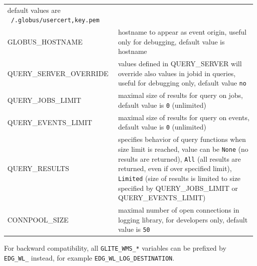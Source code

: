 \begin{tabularx}{\textwidth}{l>{\raggedright\arraybackslash}X}
   default values are \texttt{~/.globus/user{cert,key}.pem} \\
GLOBUS\_HOSTNAME & 
   hostname to appear as event origin, useful only for debugging, 
   default value is hostname \\
QUERY\_SERVER\_OVERRIDE & 
   values defined in QUERY\_SERVER will override also values in jobid in queries,
   useful for debugging only, 
   default value \texttt{no} \\
QUERY\_JOBS\_LIMIT & 
   maximal size of results for query on jobs, 
   default value is  \texttt{0} (unlimited) \\
QUERY\_EVENTS\_LIMIT & 
   maximal size of results for query on events, 
   default value is  \texttt{0} (unlimited) \\
QUERY\_RESULTS & 
   specifies behavior of query functions when size limit is reached,
   value can be \texttt{None} (no results are returned),
   \texttt{All} (all results are returned, even if over specified limit),
   \texttt{Limited} (size of results is limited to size specified by QUERY\_JOBS\_LIMIT
   or QUERY\_EVENTS\_LIMIT) \\
CONNPOOL\_SIZE & 
   maximal number of open connections in logging library,
   for developers only,
   default value is \texttt{50} \\
\end{tabularx}

For backward compatibility, all \verb'GLITE_WMS_*' variables can be prefixed by
\verb'EDG_WL_' instead, for example \verb'EDG_WL_LOG_DESTINATION'.

